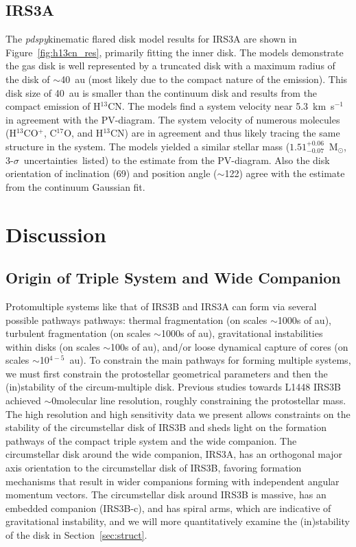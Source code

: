 \documentclass[twocolumn, 12pt,trackchanges]{aastex63}
\newcommand{\htcn}{H$^{13}$CN}
\newcommand{\cso}{C$^{17}$O}
\newcommand{\htcop}{H$^{13}$CO$^+$}
\renewcommand{\deg}{\degr}
\newcommand{\pdspy}{\textit{pdspy}}
\newcommand{\ab}{$\sim$}
\newcommand{\solm}{M$_{\odot}$}
\begin{document}
\subsection{IRS3A}
The \pdspy\space kinematic flared disk model results for IRS3A are shown in Figure~\ref{fig:h13cn_res}, primarily fitting the inner disk. The models demonstrate the gas disk is well represented by a truncated disk with a maximum radius of the disk of \ab40~au (most likely due to the compact nature of the emission). This disk size of 40~au is smaller than the continuum disk and results from the compact emission of \htcn. The models find a system velocity near 5.3~km~s$^{-1}$\space in agreement with the PV-diagram. The system velocity of numerous molecules (\htcop, \cso, and \htcn) are in agreement and thus likely tracing the same structure in the system. The models yielded a similar stellar mass ($1.51^{+0.06}_{-0.07}$~\solm, 3-$\sigma$~uncertainties~listed) to the estimate from the PV-diagram. Also the disk orientation of inclination (69\deg) and position angle (\ab122\deg) agree with the estimate from the continuum Gaussian fit.


\section{Discussion}\label{sec:discussion}

\subsection{Origin of Triple System and Wide Companion}\label{sec:origin}
Protomultiple systems like that of IRS3B and IRS3A can form via several possible pathways pathways: thermal fragmentation (on scales \ab1000s of au), turbulent fragmentation (on scales \ab1000s of au), gravitational instabilities within disks (on scales \ab100s of au), and/or loose dynamical capture of cores (on scales \ab10$^{4-5}$~au). To constrain the main pathways for forming multiple systems, we must first constrain the protostellar geometrical parameters and then the (in)stability of the circum-multiple disk. Previous studies towards L1448 IRS3B \citep[see ][]{2016Natur.538..483T} achieved \ab0\space molecular line resolution, roughly constraining the protostellar mass. The high resolution and high sensitivity data we present allows constraints on the stability of the circumstellar disk of IRS3B and sheds light on the formation pathways of the compact triple system and the wide companion. The circumstellar disk around the wide companion, IRS3A, has an orthogonal major axis orientation to the circumstellar disk of IRS3B, favoring formation mechanisms that result in wider companions forming with independent angular momentum vectors. The circumstellar disk around IRS3B is massive, has an embedded companion (IRS3B-c), and has spiral arms, which are indicative of gravitational instability, and we will more quantitatively examine the (in)stability of the disk in Section~\ref{sec:struct}.
\end{document}
